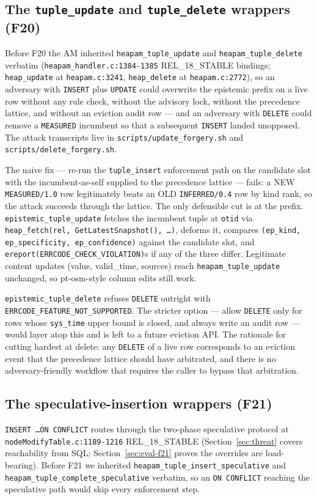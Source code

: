 \documentclass[sigconf, nonacm]{acmart}
\begin{document}
\subsection{The \texttt{tuple\_update} and \texttt{tuple\_delete} wrappers (F20)}
\label{sec:impl-f20}
Before F20 the AM inherited \texttt{heapam\_tuple\_update} and \texttt{heapam\_tuple\_delete} verbatim (\texttt{heapam\_handler.c:1384-1385} REL\_18\_STABLE bindings; \texttt{heap\_update} at \texttt{heapam.c:3241}, \texttt{heap\_delete} at \texttt{heapam.c:2772}), so an adversary with \texttt{INSERT} plus \texttt{UPDATE} could overwrite the epistemic prefix on a live row without any rule check, without the advisory lock, without the precedence lattice, and without an eviction audit row --- and an adversary with \texttt{DELETE} could remove a \texttt{MEASURED} incumbent so that a subsequent \texttt{INSERT} landed unopposed. The attack transcripts live in \texttt{scripts/update\_forgery.sh} and \texttt{scripts/delete\_forgery.sh}.

The naive fix --- re-run the \texttt{tuple\_insert} enforcement path on the candidate slot with the incumbent-as-self supplied to the precedence lattice --- fails: a NEW \texttt{MEASURED/1.0} row legitimately beats an OLD \texttt{INFERRED/0.4} row by kind rank, so the attack succeeds through the lattice. The only defensible cut is at the prefix. \texttt{epistemic\_tuple\_update} fetches the incumbent tuple at \texttt{otid} via \texttt{heap\_fetch(rel, GetLatestSnapshot(), \dots)}, deforms it, compares \texttt{(ep\_kind, ep\_specificity, ep\_confidence)} against the candidate slot, and \texttt{ereport(ERRCODE\_CHECK\_VIOLATION)}s if any of the three differ. Legitimate content updates (value, valid\_time, sources) reach \texttt{heapam\_tuple\_update} unchanged, so pt-osm-style column edits still work.

\texttt{epistemic\_tuple\_delete} refuses \texttt{DELETE} outright with \texttt{ERRCODE\_FEATURE\_NOT\_SUPPORTED}. The stricter option --- allow \texttt{DELETE} only for rows whose \texttt{sys\_time} upper bound is closed, and always write an audit row --- would layer atop this and is left to a future eviction API. The rationale for cutting hardest at delete: any \texttt{DELETE} of a live row corresponds to an eviction event that the precedence lattice should have arbitrated, and there is no adversary-friendly workflow that requires the caller to bypass that arbitration.

\subsection{The speculative-insertion wrappers (F21)}
\label{sec:impl-f21}
\texttt{INSERT \dots ON CONFLICT} routes through the two-phase speculative protocol at \texttt{nodeModifyTable.c:1189-1216} REL\_18\_STABLE (Section~\ref{sec:threat} covers reachability from SQL; Section~\ref{sec:eval-f21} proves the overrides are load-bearing). Before F21 we inherited \texttt{heapam\_tuple\_insert\_speculative} and \texttt{heapam\_tuple\_complete\_speculative} verbatim, so an \texttt{ON CONFLICT} reaching the speculative path would skip every enforcement step.
\end{document}
